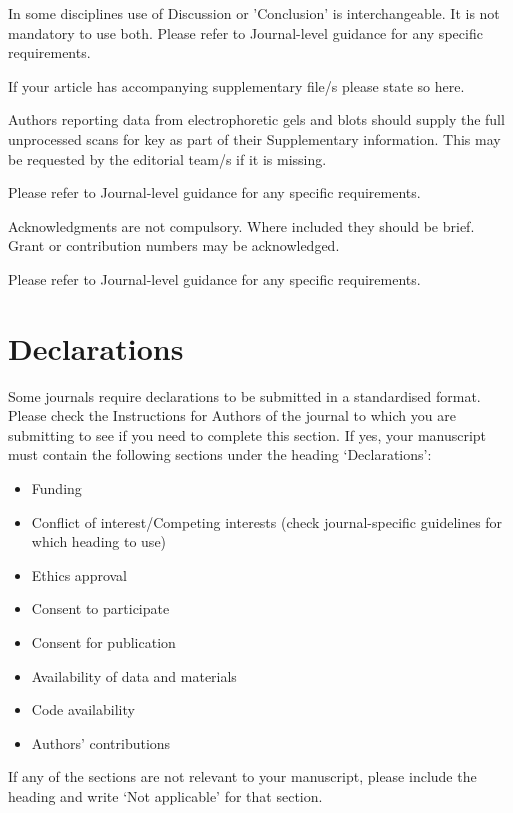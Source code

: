 \documentclass[sn-mathphys]{sn-jnl}%
\theoremstyle{thmstyleone}%
\theoremstyle{thmstyletwo}%
\theoremstyle{thmstylethree}%
\begin{document}
In some disciplines use of Discussion or 'Conclusion' is interchangeable. It is not mandatory to use both. Please refer to Journal-level guidance for any specific requirements. 

\backmatter


If your article has accompanying supplementary file/s please state so here. 

Authors reporting data from electrophoretic gels and blots should supply the full unprocessed scans for key as part of their Supplementary information. This may be requested by the editorial team/s if it is missing.

Please refer to Journal-level guidance for any specific requirements.


Acknowledgments are not compulsory. Where included they should be brief. Grant or contribution numbers may be acknowledged.

Please refer to Journal-level guidance for any specific requirements.

\section*{Declarations}

Some journals require declarations to be submitted in a standardised format. Please check the Instructions for Authors of the journal to which you are submitting to see if you need to complete this section. If yes, your manuscript must contain the following sections under the heading `Declarations':

\begin{itemize}
\item Funding
\item Conflict of interest/Competing interests (check journal-specific guidelines for which heading to use)
\item Ethics approval 
\item Consent to participate
\item Consent for publication
\item Availability of data and materials
\item Code availability 
\item Authors' contributions
\end{itemize}

\noindent
If any of the sections are not relevant to your manuscript, please include the heading and write `Not applicable' for that section. 
\end{document}
